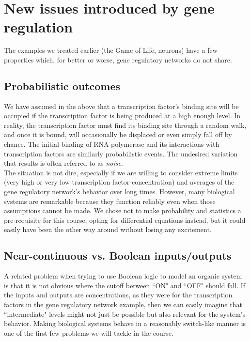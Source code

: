 \documentclass{article}
\begin{document}
\section*{New issues introduced by gene regulation}

The examples we treated earlier (the Game of Life, neurons) have a few properties which, for better or worse, gene regulatory networks do not share.

\subsection*{Probabilistic outcomes}

We have assumed in the above that a transcription factor's binding site will be occupied  if the transcription factor is being produced at a high enough level. In reality, the transcription factor must find its binding site through a random walk, and once it is bound, will occasionally be displaced or even simply fall off by chance. The initial binding of RNA polymerase and its interactions with transcription factors are similarly probabilistic events. The undesired variation that results is often referred to as \textit{noise}.\\

The situation is not dire, especially if we are willing to consider extreme limits (very high or very low transcription factor concentration) and averages of the gene regulatory network's behavior over long times. However, many biological systems are remarkable because they function reliably even when those assumptions cannot be made. We chose not to make probability and statistics a pre-requisite for this course, opting for differential equations instead, but it could easily have been the other way around without losing any excitement.

\subsection*{Near-continuous vs. Boolean inputs/outputs}

A related problem when trying to use Boolean logic to model an organic system is that it is not obvious where the cutoff between ``ON" and ``OFF" should fall. If the inputs and outputs are concentrations, as they were for the transcription factors in the gene regulatory network example, then we can easily imagine that ``intermediate" levels might not just be possible but also relevant for the system's behavior. Making biological systems behave in a reasonably switch-like manner is one of the first few problems we will tackle in the course.\\
\end{document}
